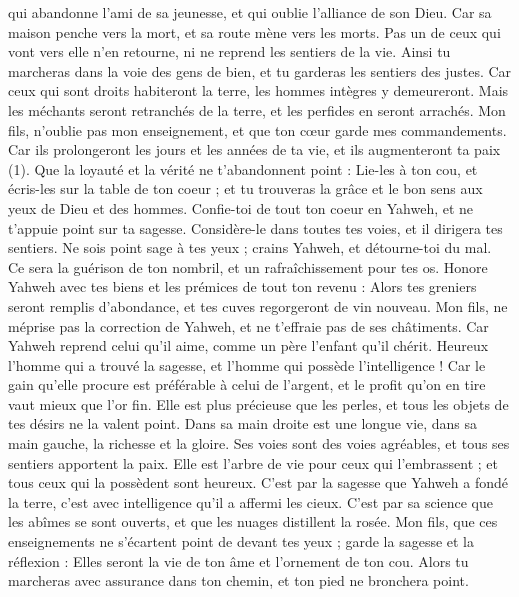 \begin{multicols}{2}
qui abandonne l’ami de sa jeunesse, et qui oublie l'alliance de son Dieu.
Car sa maison penche vers la mort, et sa route mène vers les morts.
Pas un de ceux qui vont vers elle n'en retourne, ni ne reprend les sentiers de la vie.
Ainsi tu marcheras dans la voie des gens de bien, et tu garderas les sentiers des justes.
Car ceux qui sont droits habiteront  la terre, les hommes intègres y demeureront.
Mais les méchants seront retranchés de la terre, et les perfides en seront arrachés.
\VerseOne{}Mon fils, n’oublie pas mon enseignement, et que ton cœur garde mes commandements.
Car ils prolongeront les jours et les années de ta vie, et ils augmenteront  ta paix (1).
Que la loyauté et la vérité ne t'abandonnent point : Lie-les à ton cou, et écris-les sur la table de ton coeur ;
et tu trouveras la grâce et le bon sens aux yeux de Dieu et des hommes.
Confie-toi de tout ton coeur en Yahweh, et ne t'appuie point sur ta sagesse.
Considère-le dans toutes tes voies, et il dirigera tes sentiers.
Ne sois point sage à tes yeux ; crains Yahweh, et détourne-toi du mal.
Ce sera la guérison de ton nombril, et un rafraîchissement pour tes os.
Honore Yahweh avec tes biens et les prémices de tout ton revenu :
Alors tes greniers seront remplis d'abondance, et tes cuves regorgeront de vin nouveau.
Mon fils, ne méprise pas la correction de Yahweh, et ne t’effraie pas de ses châtiments.
Car Yahweh reprend celui qu'il aime, comme un père l'enfant qu’il chérit.
Heureux l’homme qui a trouvé la sagesse, et l'homme qui possède l'intelligence !
Car le gain qu'elle procure est préférable à celui de l'argent, et le profit qu'on en tire vaut mieux que l’or fin.
Elle est plus précieuse que les perles, 	et tous les objets de tes désirs ne la valent point.
Dans sa main droite est une longue vie, dans sa main gauche, la richesse et la gloire.
Ses voies sont des voies agréables, et tous ses sentiers apportent la paix.
Elle est l'arbre de vie pour ceux qui l'embrassent ; et tous ceux qui la possèdent sont heureux.
C’est par la sagesse que Yahweh a fondé la terre, c’est avec intelligence qu’il a affermi les cieux.
C’est par sa science que les abîmes se sont ouverts, et que les nuages distillent la rosée.
Mon fils, que ces enseignements ne s'écartent point de devant tes yeux ; garde la sagesse et la réflexion :
Elles seront la vie de ton âme et l'ornement de ton cou.
Alors tu marcheras avec assurance dans ton chemin, et ton pied ne bronchera point.

\end{multicols}
